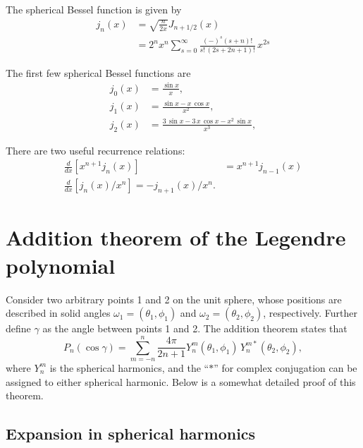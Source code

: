 \documentclass[11pt]{article}
\begin{document}
The spherical Bessel function is given by
\begin{align}
j_n(x)
&= \sqrt{ \frac{ n } { 2 x } } J_{n + 1/2}(x) \\
&= 2^n x^n
\sum_{s = 0}^\infty
\frac { (-)^s (s + n)! }
{ s! \, (2 s + 2 n + 1)! }
\,
x^{2s}
\label{eq:besselj}
\end{align}

The first few spherical Bessel functions are
\begin{align*}
  j_0(x) &= \frac { \sin x } { x }, \\
  j_1(x) &= \frac { \sin x - x \, \cos x } { x^2 }, \\
  j_2(x) &= \frac { 3 \, \sin x - 3 \, x \, \cos x - x^2 \, \sin x } { x^3 },
\end{align*}

There are two useful recurrence relations:
\begin{align}
  \frac{d}{dx}
  \left[
    x^{n+1} j_n(x)
  \right]
&=
  x^{n+1} j_{n - 1}(x)
\label{eq:recur_jn1}
  \\
  \frac{d}{dx}
  \left[
    j_n(x) / x^n
  \right]
=
  - j_{n+1}(x) / x^n.
\label{eq:recur_jn2}
\end{align}


\section{Addition theorem of the Legendre polynomial}



Consider two arbitrary points 1 and 2 on the unit sphere,
whose positions are described in solid angles
$\omega_1 = (\theta_1, \phi_1)$
and
$\omega_2 = (\theta_2, \phi_2)$, respectively.
%
Further define $\gamma$ as the angle between points 1 and 2.
%
The addition theorem states that
\begin{equation}
  P_n(\cos\gamma)
= \sum_{m = -n}^n \frac{ 4 \pi } { 2 n + 1 }
  Y_n^m(\theta_1, \phi_1) \, Y_n^{m*}(\theta_2, \phi_2),
\label{eq:addition}
\end{equation}
where $Y_n^m$ is the spherical harmonics,
and the ``$*$'' for complex conjugation
can be assigned to either spherical harmonic.
Below is a somewhat detailed proof of this theorem.



\subsection{Expansion in spherical harmonics}
\end{document}
